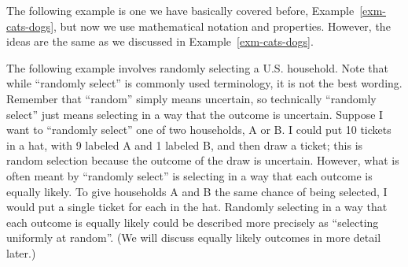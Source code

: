 \documentclass[
  letterpaper,
  DIV=11,
  numbers=noendperiod]{scrreprt}
\theoremstyle{plain}
\theoremstyle{definition}
\theoremstyle{definition}
\theoremstyle{definition}
\theoremstyle{remark}
\begin{document}
The following example is one we have basically covered before,
Example~\ref{exm-cats-dogs}, but now we use mathematical notation and
properties. However, the ideas are the same as we discussed in
Example~\ref{exm-cats-dogs}.

The following example involves randomly selecting a U.S. household. Note
that while ``randomly select'' is commonly used terminology, it is not
the best wording. Remember that ``random'' simply means uncertain, so
technically ``randomly select'' just means selecting in a way that the
outcome is uncertain. Suppose I want to ``randomly select'' one of two
households, A or B. I could put 10 tickets in a hat, with 9 labeled A
and 1 labeled B, and then draw a ticket; this is random selection
because the outcome of the draw is uncertain. However, what is often
meant by ``randomly select'' is selecting in a way that each outcome is
equally likely. To give households A and B the same chance of being
selected, I would put a single ticket for each in the hat. Randomly
selecting in a way that each outcome is equally likely could be
described more precisely as ``selecting uniformly at random''. (We will
discuss equally likely outcomes in more detail later.)
\end{document}
